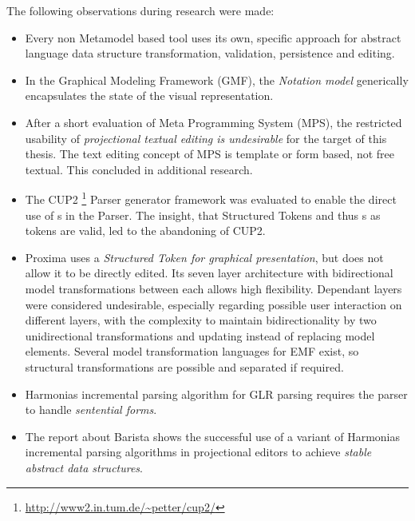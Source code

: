 The following observations during research were made:
\begin{itemize}
	\item Every non Metamodel based tool uses its own, specific approach for abstract language data structure transformation, validation, persistence and editing.
	\item In the Graphical Modeling Framework (GMF), the \emph{Notation model} generically encapsulates the state of the visual representation.
	\item After a short evaluation of Meta Programming System (MPS), the restricted usability of \emph{projectional textual editing is undesirable} for the target of this thesis. The text editing concept of MPS is template or form based, not free textual. This concluded in additional research.
	\item The CUP2 \footnote{\raggedright \url{http://www2.in.tum.de/~petter/cup2/}} Parser generator framework was evaluated to enable the direct use of s in the Parser. The insight, that Structured Tokens and thus s as tokens are valid, led to the abandoning of CUP2. 
	\item Proxima uses a \emph{Structured Token for graphical presentation}, but does not allow it to be directly edited.  Its seven layer architecture with bidirectional model transformations between each allows high flexibility. Dependant layers were considered undesirable, especially regarding possible user interaction on different layers, with the complexity to maintain bidirectionality by two unidirectional transformations and updating instead of replacing model elements. Several model transformation languages for EMF exist, so structural transformations are possible and separated if required. 
		\item Harmonias incremental parsing algorithm for GLR parsing requires the parser to handle \emph{sentential forms}.
		\item The report \cite{Barista} about Barista shows the successful use of a variant of Harmonias incremental parsing algorithms in projectional editors to achieve \emph{stable abstract data structures}.
\end{itemize}


